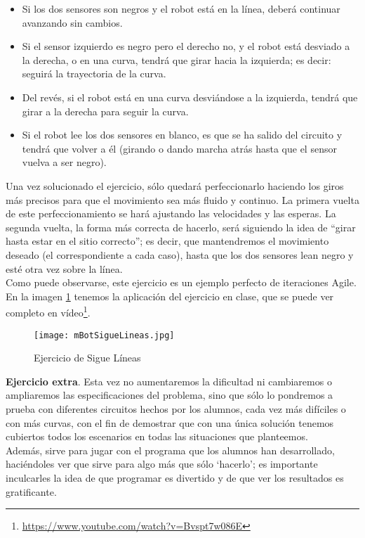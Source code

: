 \begin{description}
\begin{itemize}
	\item Si los dos sensores son negros y el robot está en la línea, deberá continuar avanzando sin cambios.
	\item Si el sensor izquierdo es negro pero el derecho no, y el robot está desviado a la derecha, o en una curva, tendrá que girar hacia la izquierda; es decir: seguirá la trayectoria de la curva.
	\item Del revés, si el robot está en una curva desviándose a la izquierda, tendrá que girar a la derecha para seguir la curva.
	\item Si el robot lee los dos sensores en blanco, es que se ha salido del circuito y tendrá que volver a él (girando o dando marcha atrás hasta que el sensor vuelva a ser negro).
\end{itemize}
Una vez solucionado el ejercicio, sólo quedará perfeccionarlo haciendo los giros más precisos para que el movimiento sea más fluido y continuo. La primera vuelta de este perfeccionamiento se hará ajustando las velocidades y las esperas. La segunda vuelta, la forma más correcta de hacerlo, será siguiendo la idea de ``girar hasta estar en el sitio correcto''; es decir, que mantendremos el movimiento deseado (el correspondiente a cada caso), hasta que los dos sensores lean negro y esté otra vez sobre la línea.\\
Como puede observarse, este ejercicio es un ejemplo perfecto de iteraciones Agile.
En la imagen \ref{img:mBotSigueLineas} tenemos la aplicación del ejercicio en clase, que se puede ver completo en vídeo\footnote{\href{https://www.youtube.com/watch?v=Bvspt7w086E}{https://www.youtube.com/watch?v=Bvspt7w086E}}.
\begin{figure}[H]
	\texttt{[image: mBotSigueLineas.jpg]}
	\centering	
	\caption{Ejercicio de Sigue Líneas}
	\label{img:mBotSigueLineas}
\end{figure}

\textbf{Ejercicio extra}. Esta vez no aumentaremos la dificultad ni cambiaremos o ampliaremos las especificaciones del problema, sino que sólo lo pondremos a prueba con diferentes circuitos hechos por los alumnos, cada vez más difíciles o con más curvas, con el fin de demostrar que con una única solución tenemos cubiertos todos los escenarios en todas las situaciones que planteemos. \\
Además, sirve para jugar con el programa que los alumnos han desarrollado, haciéndoles ver que sirve para algo más que sólo `hacerlo'; es importante inculcarles la idea de que programar es divertido y de que ver los resultados es gratificante.


\end{description}
